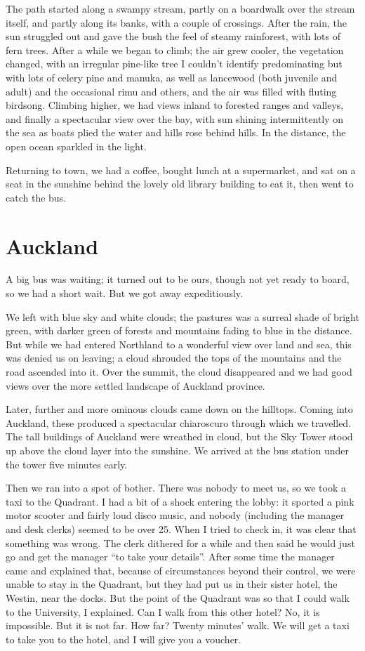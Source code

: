 \documentclass[12pt,a4paper]{article}
\begin{document}
The path started along a swampy stream, partly on a boardwalk over the stream
itself, and partly along its banks, with a couple of crossings. After the
rain, the sun struggled out and gave the bush the feel of steamy rainforest,
with lots of fern trees. After a while we began to climb; the air grew
cooler, the vegetation changed, with an irregular pine-like tree I couldn't
identify predominating but with lots of celery pine and manuka, as well as
lancewood (both juvenile and adult) and the occasional rimu and others,
and the air was filled with fluting birdsong. Climbing higher, we had
views inland to forested ranges and valleys, and finally a spectacular
view over the bay, with sun shining intermittently on the sea as boats
plied the water and hills rose behind hills. In the distance, the open
ocean sparkled in the light.

Returning to town, we had a coffee, bought lunch at a supermarket, and sat
on a seat in the sunshine behind the lovely old library building to eat it,
then went to catch the bus.

\section{Auckland}

A big bus was waiting; it turned out to be ours, though not yet ready to
board, so we had a short wait. But we got away expeditiously.

We left with blue sky and white clouds; the pastures was a surreal shade
of bright green, with darker green of forests and mountains fading to blue
in the distance. But while we had entered Northland to a wonderful view over
land and sea, this was denied us on leaving; a cloud shrouded the tops of
the mountains and the road ascended into it. Over the summit, the 
cloud disappeared and we had good views over the more settled landscape of
Auckland province.

Later, further and more ominous clouds came down on the hilltops. Coming into
Auckland, these produced a spectacular chiaroscuro through which we travelled.
The tall buildings of Auckland were wreathed in cloud, but the Sky Tower
stood up above the cloud layer into the sunshine. We arrived at the bus
station under the tower five minutes early.

Then we ran into a spot of bother. There was nobody to meet us, so we took
a taxi to the Quadrant. I had a bit of a shock entering the lobby: it sported
a pink motor scooter and fairly loud disco music, and nobody (including the
manager and desk clerks) seemed to be over 25. When I tried to check in,
it was clear that something was wrong. The clerk dithered for a while and
then said he would just go and get the manager ``to take your details''. After
some time the manager came and explained that, because of circumstances
beyond their control, we were unable to stay in the Quadrant, but they had
put us in their sister hotel, the Westin, near the docks. But the point of
the Quadrant was so that I could walk to the University, I explained. Can I
walk from this other hotel? No, it is impossible. But it is not far. How far?
Twenty minutes' walk. We will get a taxi to take you to the hotel, and I will
give you a voucher.
\end{document}
